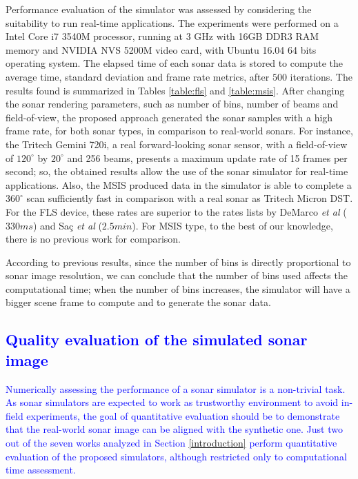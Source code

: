 \documentclass[final,5p,times]{elsarticle}
\begin{document}
Performance evaluation of the simulator was assessed by considering the suitability to run real-time applications. The experiments were performed on a Intel Core i7 3540M processor, running at 3 GHz with 16GB DDR3 RAM memory and NVIDIA NVS 5200M video card, with Ubuntu 16.04 64 bits operating system. The elapsed time of each sonar data is stored to compute the average time, standard deviation and frame rate metrics, after $500$ iterations. The results found is summarized in Tables \ref{table:fls} and \ref{table:msis}. After changing the sonar rendering parameters, such as number of bins, number of beams and field-of-view, the proposed approach generated the sonar samples with a high
frame rate, for both sonar types, in comparison to real-world sonars. For instance, the Tritech Gemini 720i, a real forward-looking sonar sensor, with a field-of-view of $120^{\circ}$ by $20^{\circ}$ and 256 beams, presents a maximum update rate of 15 frames per second; so, the obtained results allow the use of the sonar simulator for real-time applications. Also, the MSIS produced data in the simulator is able to complete a $360^{\circ}$ scan sufficiently fast in comparison with a real sonar as Tritech Micron DST. For the FLS device, these rates are superior to the rates lists by DeMarco \textit{et al} \cite{demarco2015} ($330 ms$) and Saç \textit{et al} \cite{sac2015} ($2.5 min$). For MSIS type, to the best of our knowledge, there is no previous work for comparison.

According to previous results, since the number of bins is directly
proportional to sonar image resolution, we can conclude that the number of bins used affects the computational time; when the number of bins increases, the simulator will have a bigger scene frame to compute and to generate the sonar data.

\subsection{\textcolor{blue}{Quality evaluation of the simulated sonar image}}

\textcolor{blue}{Numerically assessing the performance of a sonar simulator is a non-trivial task. As sonar simulators are expected to work as trustworthy environment to avoid in-field experiments, the goal of quantitative evaluation should be to demonstrate that the real-world sonar image can be aligned with the synthetic one. Just two \cite{sac2015,demarco2015} out of the seven works analyzed in Section \ref{introduction} perform quantitative evaluation of the proposed simulators, although restricted only to computational time assessment.}
\end{document}
